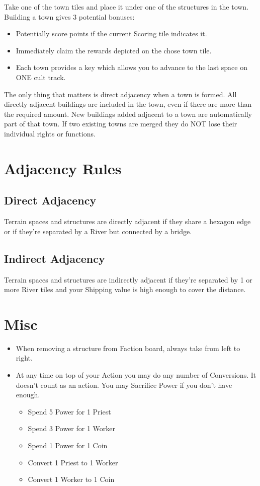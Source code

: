 \documentclass[12pt]{article}
\newenvironment{itemizeCustom}
{\begin{itemize}
  \setlength{\itemsep}{1pt}
  \setlength{\parskip}{0pt}
  \setlength{\parsep}{0pt}}
{\end{itemize}}
\begin{document}
\begin{multicols*}{2}
\noindent
Take one of the town tiles and place it under one of the structures in the town. Building a town gives 3 potential bonuses:
\begin{itemizeCustom}
    \item Potentially score points if the current Scoring tile indicates it.
    \item Immediately claim the rewards depicted on the chose town tile.
    \item Each town provides a key which allows you to advance to the last space on ONE cult track.
\end{itemizeCustom}

The only thing that matters is direct adjacency when a town is formed. All directly adjacent buildings are included in the town, even if there are more than the required amount. New buildings added adjacent to a town are automatically part of that town. If two existing towns are merged they do NOT lose their individual rights or functions.

\section*{Adjacency Rules}
\subsection*{Direct Adjacency}
Terrain spaces and structures are directly adjacent if they share a hexagon edge or if they're separated by a River but connected by a bridge.

\subsection*{Indirect Adjacency}
Terrain spaces and structures are indirectly adjacent if they're separated by 1 or more River tiles and your Shipping value is high enough to cover the distance.

\section*{Misc}
\begin{itemizeCustom}
    \item When removing a structure from Faction board, always take from left to right.
    \item At any time on top of your Action you may do any number of Conversions. It doesn't count as an action. You may Sacrifice Power if you don't have enough.
        \begin{itemizeCustom}
            \item Spend 5 Power for 1 Priest
            \item Spend 3 Power for 1 Worker
            \item Spend 1 Power for 1 Coin
            \item Convert 1 Priest to 1 Worker
            \item Convert 1 Worker to 1 Coin
        \end{itemizeCustom}
\end{itemizeCustom}

\end{multicols*}
\end{document}
